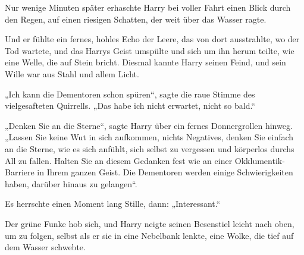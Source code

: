 Nur wenige Minuten später erhaschte Harry bei voller Fahrt einen Blick durch den Regen, auf einen riesigen Schatten, der weit über das Wasser ragte.

Und er fühlte ein fernes, hohles Echo der Leere, das von dort ausstrahlte, wo der Tod wartete, und das Harrys Geist umspülte und sich um ihn herum teilte, wie eine Welle, die auf Stein bricht. Diesmal kannte Harry seinen Feind, und sein Wille war aus Stahl und allem Licht.

„Ich kann die Dementoren schon spüren“, sagte die raue Stimme des vielgesafteten Quirrells. „Das habe ich nicht erwartet, nicht so bald.“

„Denken Sie an die Sterne“, sagte Harry über ein fernes Donnergrollen hinweg. „Lassen Sie keine Wut in sich aufkommen, nichts Negatives, denken Sie einfach an die Sterne, wie es sich anfühlt, sich selbst zu vergessen und körperlos durchs All zu fallen. Halten Sie an diesem Gedanken fest wie an einer Okklumentik-Barriere in Ihrem ganzen Geist. Die Dementoren werden einige Schwierigkeiten haben, darüber hinaus zu gelangen“.

Es herrschte einen Moment lang Stille, dann: „Interessant.“

Der grüne Funke hob sich, und Harry neigte seinen Besenstiel leicht nach oben, um zu folgen, selbst als er sie in eine Nebelbank lenkte, eine Wolke, die tief auf dem Wasser schwebte.

